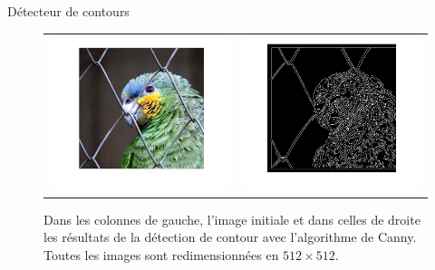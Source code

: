 \begin{frame}{Détecteur de contours}
\begin{figure}[ht!]
\centering
\begin{tabular}{cc}
\includegraphics[width = .5\columnwidth]{fig/parrot_rescale.png} &
\includegraphics[width = .5\columnwidth]{fig/contour_parrot.png}
\end{tabular}
\caption{Dans les colonnes de gauche, l'image initiale et dans celles de droite les résultats de la détection de contour avec l'algorithme de Canny. Toutes les images sont redimensionnées en $512\times 512$. }
\end{figure}
\end{frame}



